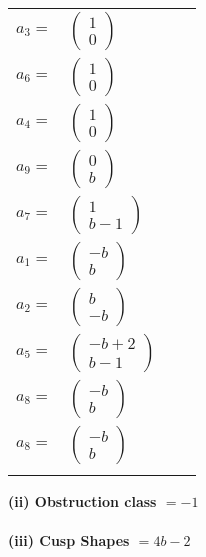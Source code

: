 \documentclass[1p]{elsarticle_modified}
\theoremstyle{definition}
\begin{document}
\begin{tabular}{m{7pt} m{180pt} m{7pt} m{180pt} }
\flushright $a_{3}=$&$\begin{pmatrix}1\\0\end{pmatrix}$ \\
\flushright $a_{6}=$&$\begin{pmatrix}1\\0\end{pmatrix}$ \\
\flushright $a_{4}=$&$\begin{pmatrix}1\\0\end{pmatrix}$ \\
\flushright $a_{9}=$&$\begin{pmatrix}0\\b\end{pmatrix}$ \\
\flushright $a_{7}=$&$\begin{pmatrix}1\\b-1\end{pmatrix}$ \\
\flushright $a_{1}=$&$\begin{pmatrix}- b\\b\end{pmatrix}$ \\
\flushright $a_{2}=$&$\begin{pmatrix}b\\- b\end{pmatrix}$ \\
\flushright $a_{5}=$&$\begin{pmatrix}- b+2\\b-1\end{pmatrix}$ \\
\flushright $a_{8}=$&$\begin{pmatrix}- b\\b\end{pmatrix}$\\ \flushright $a_{8}=$&$\begin{pmatrix}- b\\b\end{pmatrix}$\\&\end{tabular}
\flushleft \textbf{(ii) Obstruction class $= -1$}\\~\\
\flushleft \textbf{(iii) Cusp Shapes $= 4 b-2$}\\~\\
\end{document}
